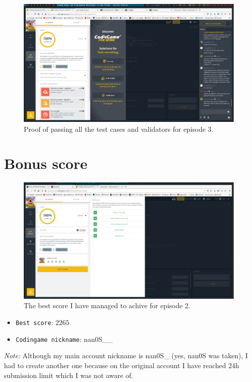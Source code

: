 \documentclass[11pt]{article}
\begin{document}
	 \begin{figure}[h]
 	\centering
	\includegraphics[scale=0.3]{screens/mars-lander-episode3} 	
	\caption{Proof of passing all the test cases and validators for episode 3.}
 	\end{figure}
 	
 	\section{Bonus score}
	\begin{figure}[H]
 	\centering
	\includegraphics[scale=0.3]{screens/mars-lander-episode2-1} 	
	\caption{The best score I have managed to achive for episode 2.}
 	\end{figure}
 	
 	\begin{itemize}
 		\item[] \texttt{Best score}: $2265$
 		\item[] \texttt{Codingame nickname}: nan0S\_\_
 	\end{itemize}
 	\textit{Note:} Although my main account nickname is nan0S\_ (yes, nan0S was taken), I had to create another one because on the original account I have reached 24h submission limit which I was not aware of.
 	
\end{document}
